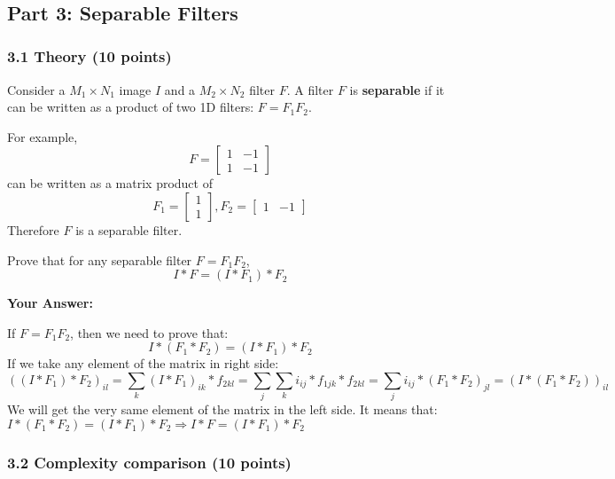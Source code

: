 \documentclass[11pt]{article}
\begin{document}
    \begin{center}
    \end{center}
    { \hspace*{\fill} \\}
    
    \subsection{Part 3: Separable Filters}\label{part-3-separable-filters}

    \subsubsection{3.1 Theory (10 points)}\label{theory-10-points}

Consider a \(M_1\times{N_1}\) image \(I\) and a \(M_2\times{N_2}\)
filter \(F\). A filter \(F\) is \textbf{separable} if it can be written
as a product of two 1D filters: \(F=F_1F_2\).

For example, \[F=
\begin{bmatrix}
1 & -1 \\
1 & -1
\end{bmatrix}
\] can be written as a matrix product of \[F_1=
\begin{bmatrix}
1  \\
1
\end{bmatrix},
F_2=
\begin{bmatrix}
1 & -1
\end{bmatrix}
\] Therefore \(F\) is a separable filter.

Prove that for any separable filter \(F=F_1F_2\), \[I*F=(I*F_1)*F_2\]

    \textbf{Your Answer:}

If \(F=F_1F_2\), then we need to prove that: \[I*(F_1*F_2)=(I*F_1)*F_2\]
If we take any element of the matrix in right side:
\[((I*F_1)*F_2)_{il}=\sum_{k}(I*F_1)_{ik}*f_{2kl}=\sum_{j}\sum_{k}i_{ij}*f_{1jk}*f_{2kl}=\sum_{j}i_{ij}*(F_1*F_2)_{jl}=(I*(F_1*F_2))_{il}\]
We will get the very same element of the matrix in the left side. It
means that: \(I*(F_1*F_2)=(I*F_1)*F_2 \Rightarrow I*F=(I*F_1)*F_2\)

    \subsubsection{3.2 Complexity comparison (10
points)}\label{complexity-comparison-10-points}
\end{document}
